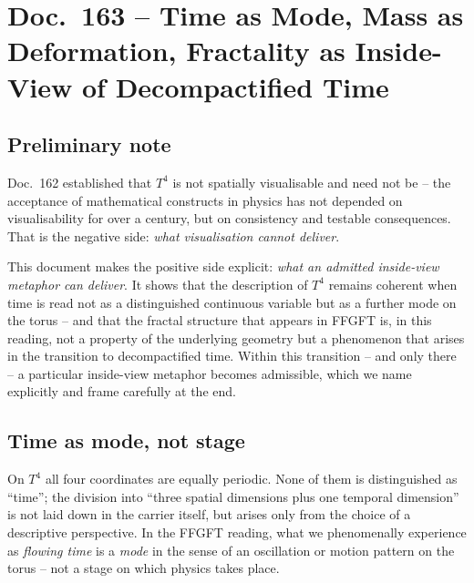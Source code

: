 
\chapter*{Doc.~163 -- Time as Mode, Mass as Deformation, Fractality as Inside-View of Decompactified Time}

\section*{Preliminary note}

Doc.~162 established that $T^4$ is not spatially visualisable and need
not be -- the acceptance of mathematical constructs in physics has
not depended on visualisability for over a century, but on
consistency and testable consequences. That is the negative side:
\emph{what visualisation cannot deliver}.

This document makes the positive side explicit: \emph{what an
admitted inside-view metaphor can deliver}. It shows that the
description of $T^4$ remains coherent when time is read not as a
distinguished continuous variable but as a further mode on the
torus -- and that the fractal structure that appears in FFGFT is,
in this reading, not a property of the underlying geometry but a
phenomenon that arises in the transition to decompactified time.
Within this transition -- and only there -- a particular inside-view
metaphor becomes admissible, which we name explicitly and frame
carefully at the end.

\section{Time as mode, not stage}

On $T^4$ all four coordinates are equally periodic. None of them is
distinguished as ``time''; the division into ``three spatial dimensions
plus one temporal dimension'' is not laid down in the carrier itself,
but arises only from the choice of a descriptive perspective. In the
FFGFT reading, what we phenomenally experience as \emph{flowing time}
is a \emph{mode} in the sense of an oscillation or motion pattern on
the torus -- not a stage on which physics takes place.

